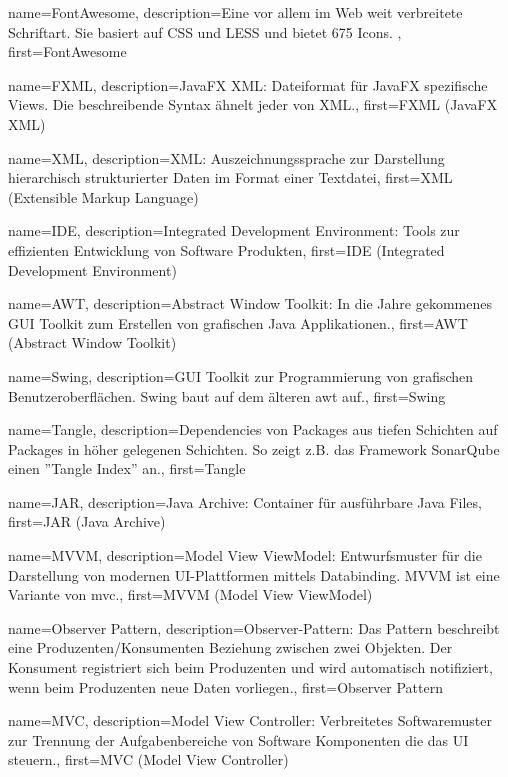 {
	name={FontAwesome},
	description={Eine vor allem im Web weit verbreitete Schriftart. Sie basiert auf CSS und LESS und bietet 675 Icons. },
	first={FontAwesome}
}

{
	name={FXML},
	description={JavaFX XML: Dateiformat für JavaFX spezifische Views. Die beschreibende Syntax ähnelt jeder von XML.},
	first={FXML (JavaFX XML)}
}

{
	name={XML},
	description={XML: Auszeichnungssprache zur Darstellung hierarchisch strukturierter Daten im Format einer Textdatei},
	first={XML (Extensible Markup Language)}
}

{
	name={IDE},
	description={Integrated Development Environment: Tools zur effizienten Entwicklung von Software Produkten},
	first={IDE (Integrated Development Environment)}
}

{
	name={AWT},
	description={Abstract Window Toolkit: In die Jahre gekommenes GUI Toolkit zum Erstellen von grafischen Java Applikationen.},
	first={AWT (Abstract Window Toolkit)}
}

{
	name={Swing},
	description={GUI Toolkit zur Programmierung von grafischen Benutzeroberflächen. Swing baut auf dem älteren \gls{awt} auf.},
	first={Swing}
}

{
	name={Tangle},
	description={Dependencies von Packages aus tiefen Schichten auf Packages in höher gelegenen Schichten. So zeigt z.B. das Framework SonarQube einen ''Tangle Index'' an.},
	first={Tangle}
}


{
	name={JAR},
	description={Java Archive: Container für ausführbare Java Files},
	first={JAR (Java Archive)}
}

{
	name={MVVM},
	description={Model View ViewModel: Entwurfsmuster für die Darstellung von modernen UI-Plattformen mittels Databinding. MVVM ist eine Variante von \gls{mvc}.},
	first={MVVM (Model View ViewModel)}
}

{
	name={Observer Pattern},
	description={Observer-Pattern: Das Pattern beschreibt eine Produzenten/Konsumenten Beziehung zwischen zwei Objekten. Der Konsument registriert sich beim Produzenten und wird automatisch notifiziert, wenn beim Produzenten neue Daten vorliegen.},
	first={Observer Pattern}
}

{
	name={MVC},
	description={Model View Controller: Verbreitetes Softwaremuster zur Trennung der Aufgabenbereiche von Software Komponenten die das UI steuern.},
	first={MVC (Model View Controller)}
}

